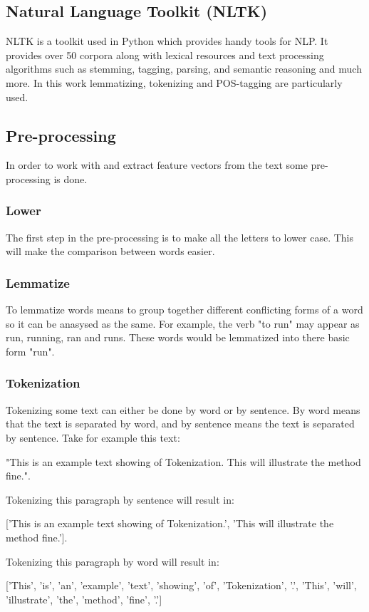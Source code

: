 \subsection{Natural Language Toolkit (NLTK)}
NLTK is a toolkit used in Python which provides handy tools for NLP. It provides over 50 corpora along with lexical resources and text processing algorithms such as stemming, tagging, parsing, and semantic reasoning and much more.\cite{nltk_book} In this work lemmatizing, tokenizing and POS-tagging are particularly used.
\subsection{Pre-processing}
In order to work with and extract feature vectors from the text some pre-processing is done. 
\subsubsection{Lower}
The first step in the pre-processing is to make all the letters to lower case. This will make the comparison between words easier.  
\subsubsection{Lemmatize}
To lemmatize words means to group together different conflicting forms of a word so it can be anasysed as the same. 
For example, the verb "to run" may appear as run, running, ran and runs. These words would be lemmatized into there basic form "run". 
\subsubsection{Tokenization}
Tokenizing some text can either be done by word or by sentence. By word means that the text is separated by word, and by sentence means the text is separated by sentence.
Take for example this text: 

"This is an example text showing of Tokenization. This will illustrate the method fine.". 

Tokenizing this paragraph by sentence will result in: 

['This is an example text showing of Tokenization.', 'This will illustrate the method fine.'].

Tokenizing this paragraph by word will result in: 

['This', 'is', 'an', 'example', 'text', 'showing', 'of', 'Tokenization', '.', 'This', 'will', 'illustrate', 'the', 'method', 'fine', '.']


